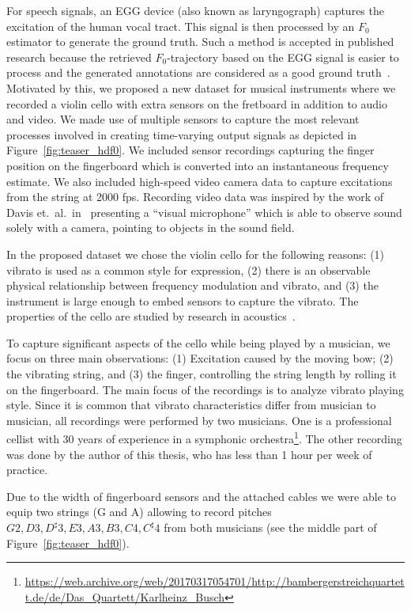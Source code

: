 For speech signals, an EGG device (also known as laryngograph) captures the excitation of the human vocal tract. 
This signal is then processed by an $F_0$ estimator to generate the ground truth. 
Such a method is accepted in published research because the retrieved $F_0$-trajectory based on the EGG signal is easier to process and the generated annotations are considered as a good ground truth~\cite{pirker11, babacan13}.
Motivated by this, we proposed a new dataset for musical instruments where we recorded a violin cello with extra sensors on the fretboard in addition to audio and video.
We made use of multiple sensors to capture the most relevant processes involved in creating time-varying output signals as depicted in Figure~\ref{fig:teaser_hdf0}.
We included sensor recordings capturing the finger position on the fingerboard which is converted into an instantaneous frequency estimate.
We also included high-speed video camera data to capture excitations from the string at 2000 fps.
Recording video data was inspired by the work of Davis et.\ al.\ in~\cite{Davis2014VisualMic} presenting a ``visual microphone'' which is able to observe sound solely with a camera, pointing to objects in the sound field. 
\par
In the proposed dataset we chose the violin cello for the following reasons: (1) vibrato is used as a common style for expression, (2) there is an observable physical relationship between frequency modulation and vibrato, and (3) the instrument is large enough to embed sensors to capture the vibrato. The properties of the cello are studied by research in acoustics~\cite{woodhouse04, woodhouse99}.
\par
To capture significant aspects of the cello while being played by a musician, we focus on three main observations: (1) Excitation caused by the moving bow; (2) the vibrating string, and (3) the finger, controlling the string length by rolling it on the fingerboard.
The main focus of the recordings is to analyze vibrato playing style. Since it is common that vibrato characteristics differ from musician to musician, all recordings were performed by two musicians. One is a professional cellist with 30 years of experience in a symphonic orchestra\footnote{\url{https://web.archive.org/web/20170317054701/http://bambergerstreichquartett.de/de/Das_Quartett/Karlheinz_Busch}}.
The other recording was done by the author of this thesis, who has less than 1 hour per week of practice.
\par
Due to the width of fingerboard sensors and the attached cables we were able to equip two strings (G and A) allowing to record pitches ${G2, D3, D^\sharp3, E3, A3, B3, C4, C^\sharp4}$ from both musicians (see the middle part of Figure~\ref{fig:teaser_hdf0}).
